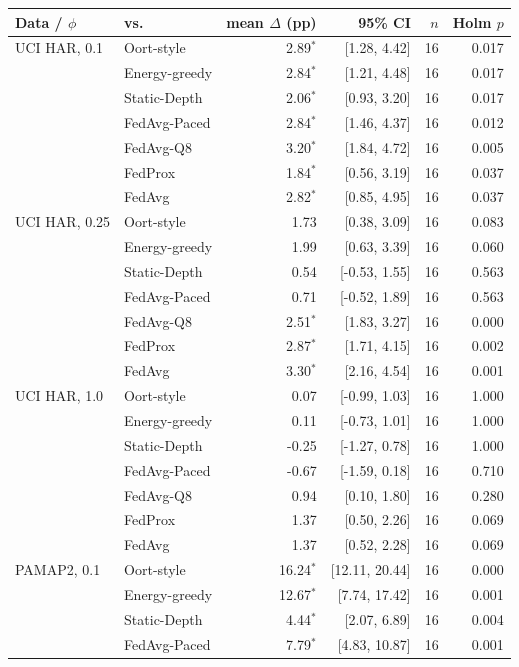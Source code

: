 \begin{tabular}{@{}llrrrr@{}}
\toprule
Data / $\phi$ & vs. & mean $\Delta$ (pp) & 95\% CI & $n$ & Holm $p$\\
\midrule
UCI HAR, 0.1 & Oort-style & 2.89$^{*}$ & [1.28, 4.42] & 16 & 0.017\\
 & Energy-greedy & 2.84$^{*}$ & [1.21, 4.48] & 16 & 0.017\\
 & Static-Depth & 2.06$^{*}$ & [0.93, 3.20] & 16 & 0.017\\
 & FedAvg-Paced & 2.84$^{*}$ & [1.46, 4.37] & 16 & 0.012\\
 & FedAvg-Q8 & 3.20$^{*}$ & [1.84, 4.72] & 16 & 0.005\\
 & FedProx & 1.84$^{*}$ & [0.56, 3.19] & 16 & 0.037\\
 & FedAvg & 2.82$^{*}$ & [0.85, 4.95] & 16 & 0.037\\
\midrule
UCI HAR, 0.25 & Oort-style & 1.73 & [0.38, 3.09] & 16 & 0.083\\
 & Energy-greedy & 1.99 & [0.63, 3.39] & 16 & 0.060\\
 & Static-Depth & 0.54 & [-0.53, 1.55] & 16 & 0.563\\
 & FedAvg-Paced & 0.71 & [-0.52, 1.89] & 16 & 0.563\\
 & FedAvg-Q8 & 2.51$^{*}$ & [1.83, 3.27] & 16 & 0.000\\
 & FedProx & 2.87$^{*}$ & [1.71, 4.15] & 16 & 0.002\\
 & FedAvg & 3.30$^{*}$ & [2.16, 4.54] & 16 & 0.001\\
\midrule
UCI HAR, 1.0 & Oort-style & 0.07 & [-0.99, 1.03] & 16 & 1.000\\
 & Energy-greedy & 0.11 & [-0.73, 1.01] & 16 & 1.000\\
 & Static-Depth & -0.25 & [-1.27, 0.78] & 16 & 1.000\\
 & FedAvg-Paced & -0.67 & [-1.59, 0.18] & 16 & 0.710\\
 & FedAvg-Q8 & 0.94 & [0.10, 1.80] & 16 & 0.280\\
 & FedProx & 1.37 & [0.50, 2.26] & 16 & 0.069\\
 & FedAvg & 1.37 & [0.52, 2.28] & 16 & 0.069\\
\midrule
PAMAP2, 0.1 & Oort-style & 16.24$^{*}$ & [12.11, 20.44] & 16 & 0.000\\
 & Energy-greedy & 12.67$^{*}$ & [7.74, 17.42] & 16 & 0.001\\
 & Static-Depth & 4.44$^{*}$ & [2.07, 6.89] & 16 & 0.004\\
 & FedAvg-Paced & 7.79$^{*}$ & [4.83, 10.87] & 16 & 0.001\\

\end{tabular}
